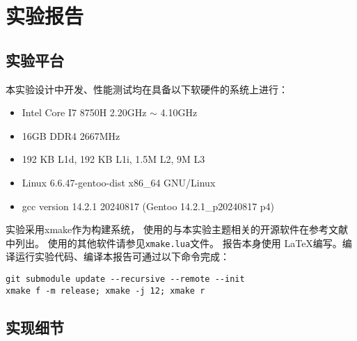 \maketitle

\begin{abstract}
    本实验分别实现了传统LRU淘汰算法在单线程以及单把锁的多线程版本，用于展示lock contention对性能的影响。
    另外实现了基于无锁队列和智能指针的近似LRU算法、
    类似于Redis方案的采样LRU算法。
    本实验分别对不同线程数量、不同缓存容量以及不同缓存访问行为三个角度出发对上述三种缓存进行性能测试。
    报告还介绍了本实验的三种缓存的部分实现细节以及其对性能的影响，最后还有本人对系统方向优化工作的感想。
    
    \textbf{关键字:}\quad LRU\quad 采样LRU\quad lock-free\quad 无锁队列\quad 并发编程
\end{abstract}

\section{实验报告}

\subsection{实验平台}

本实验设计中开发、性能测试均在具备以下软硬件的系统上进行：
\begin{itemize}
    \item Intel Core I7 8750H 2.20GHz $\sim$ 4.10GHz
    \item 16GB DDR4 2667MHz
    \item 192 KB L1d, 192 KB L1i, 1.5M L2, 9M L3
    \item Linux 6.6.47-gentoo-dist x86\_64 GNU/Linux
    \item gcc version 14.2.1 20240817 (Gentoo 14.2.1\_p20240817 p4)
\end{itemize}

实验采用xmake作为构建系统，
使用的与本实验主题相关的开源软件在参考文献中列出。
使用的其他软件请参见\verb|xmake.lua|文件。
报告本身使用 \LaTeX 编写。编译运行实验代码、编译本报告可通过以下命令完成：
\begin{verbatim}
git submodule update --recursive --remote --init
xmake f -m release; xmake -j 12; xmake r
\end{verbatim}

\subsection{实现细节}


